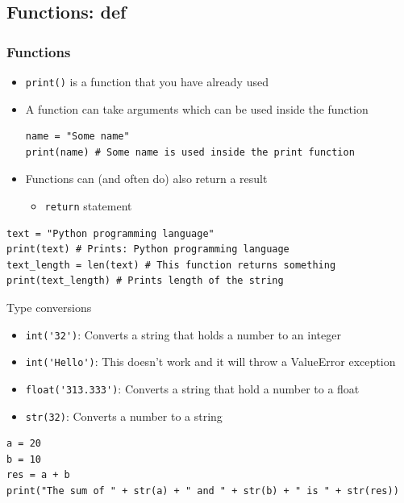 \documentclass[10pt, a4paper]{beamer} %
\begin{document}
\subsection{Functions: def} %
\label{sub:functions}
\begin{frame}\frametitle{Functions}
\begin{itemize}
    \item \lstinline!print()! is a function that you have already used
    \item A function can take arguments which can be used inside the function
    \begin{lstlisting}
name = "Some name"
print(name) # Some name is used inside the print function
    \end{lstlisting}
    \item Functions can (and often do) also return a result
    \begin{itemize}
        \item \lstinline!return! statement
    \end{itemize}
\end{itemize}

\begin{examples}
    \begin{lstlisting}
text = "Python programming language"
print(text) # Prints: Python programming language
text_length = len(text) # This function returns something
print(text_length) # Prints length of the string
    \end{lstlisting}
\end{examples}
\framebreak
\begin{block}{Type conversions}
\begin{itemize}
    \item \lstinline!int('32')!: Converts a string that holds a number to an integer
    \item \lstinline!int('Hello')!: This doesn't work and it will throw a ValueError exception
    \item \lstinline!float('313.333')!: Converts a string that hold a number to a float
    \item \lstinline!str(32)!: Converts a number to a string
\end{itemize}

\begin{examples}
\begin{lstlisting}
a = 20
b = 10
res = a + b
print("The sum of " + str(a) + " and " + str(b) + " is " + str(res))
\end{lstlisting}
\end{examples}
\end{block}


\end{frame}
\end{document}

